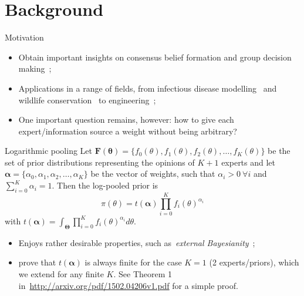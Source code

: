 \section*{Background}
\begin{frame}[t,plain]
\titlepage
\end{frame}
\begin{frame}{Motivation}
 \begin{itemize}
  \item Obtain important insights on consensus belief formation and group decision making~\citep{genest1986B};
  \item Applications in a range of fields, from infectious disease modelling~\citep{Coelho2009} and wildlife conservation~\citep{poole2000} to engineering~\citep{savchuk1994};
  \item One important question remains, however: how to give each expert/information source a weight without being arbitrary?
 \end{itemize}
\end{frame}
\begin{frame}{Logarithmic pooling}
Let $\mathbf{F(\theta)} = \{f_0(\theta), f_1(\theta), f_2(\theta), \ldots, f_K(\theta)\}$ be the set of prior distributions representing the opinions of $K+1$ experts and let $\boldsymbol\alpha =\{\alpha_0, \alpha_1, \alpha_2, \ldots, \alpha_K \}$ be the vector of weights, such that $\alpha_i > 0\: \forall i$ and $\sum_{i=0}^K \alpha_i = 1$.
Then the log-pooled prior is
\begin{equation}
\label{eq:logpool}
 \pi(\theta) = t(\boldsymbol\alpha) \prod_{i=0}^K f_i(\theta)^{\alpha_i} 
\end{equation}
with $t(\boldsymbol\alpha) = \int_{\boldsymbol\Theta}\prod_{i=0}^K f_i(\theta)^{\alpha_i}d\theta$.

\begin{itemize}
 \item Enjoys rather desirable properties, such as~\textit{external Bayesianity}~\citep{genest1986B};
 \item \cite{poole2000} prove that $t(\boldsymbol\alpha)$ is always finite for the case $K=1$ (2 experts/priors), which we extend for any finite $K$.
 See Theorem 1 in~\url{http://arxiv.org/pdf/1502.04206v1.pdf} for a simple proof.
\end{itemize}

\end{frame}
